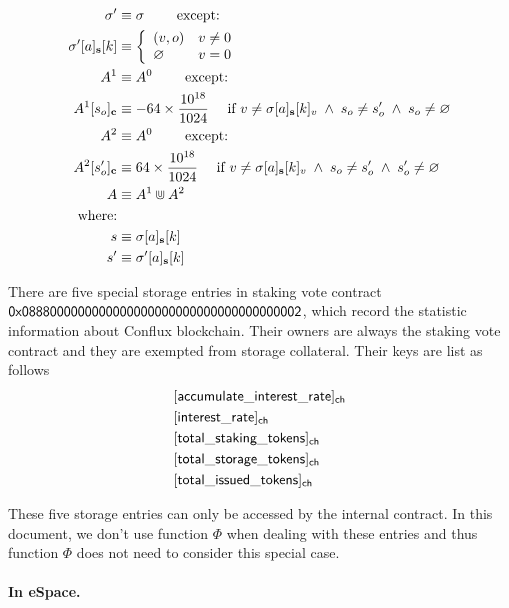 \begin{align}
	\mathbf{\sigma}'   &\equiv \mathbf{\sigma} \qquad \mbox{  except:}\\ 
	\mathbf{\sigma}'[a]_{\bf s}[k] &\equiv\left\{
		\begin{array}{ll}
			(v,o) & v\neq 0\\
			\varnothing & v= 0\\
		\end{array}
	\right.\\
	A^1 &\equiv A^0  \qquad \mbox{  except:}\\ 
	A^1[s_o]_{\bf c} &\equiv - 64 \times \frac{10^{18}}{1024} \quad \mbox{ if } v\neq \mathbf{\sigma}[a]_{\bf s}[k]_v \;\wedge\; s_o\neq s'_o \;\wedge\; s_o\neq\varnothing \\ 
	A^2 &\equiv A^0  \qquad \mbox{  except:}\\ 
	A^2[s'_o]_{\bf c} &\equiv 64 \times \frac{10^{18}}{1024} \quad \mbox{ if }v\neq \mathbf{\sigma}[a]_{\bf s}[k]_v \;\wedge\; s_o\neq s'_o \;\wedge\; s'_o\neq\varnothing \\ 
	A &\equiv A^1\Cup A^2 \\
	\text{where:} & \\
	s &\equiv \mathbf{\sigma}[a]_{\bf s}[k] \\
	s' &\equiv \mathbf{\sigma}'[a]_{\bf s}[k] 
\end{align}

There are five special storage entries in staking vote contract ${\sf 0x0888000000000000000000000000000000000002}$, which record the statistic information about Conflux blockchain. Their owners are always the staking vote contract and they are exempted from storage collateral. Their keys are list as follows 
\begin{align}
	& \sf [accumulate\char`_interest\char`_rate]_{\sf ch} \\ 
	& \sf [interest\char`_rate]_{\sf ch} \\
    & \sf [total\char`_staking\char`_tokens]_{\sf ch} \\
    & \sf [total\char`_storage\char`_tokens]_{\sf ch} \\
    & \sf [total\char`_issued\char`_tokens]_{\sf ch} 
\end{align}

These five storage entries can only be accessed by the internal contract. In this document, we don't use function $\Phi$ when dealing with these entries and thus function $\Phi$ does not need to consider this special case. 

\paragraph{In eSpace.}
